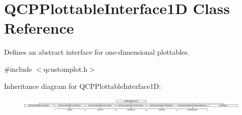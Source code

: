 \hypertarget{class_q_c_p_plottable_interface1_d}{}\section{Q\+C\+P\+Plottable\+Interface1D Class Reference}
\label{class_q_c_p_plottable_interface1_d}


Defines an abstract interface for one-\/dimensional plottables.  




{\ttfamily \#include $<$qcustomplot.\+h$>$}

Inheritance diagram for Q\+C\+P\+Plottable\+Interface1D\+:\begin{figure}[H]
\begin{center}
\leavevmode
\includegraphics[height=0.776699cm]{da/db2/class_q_c_p_plottable_interface1_d}
\end{center}
\end{figure}
